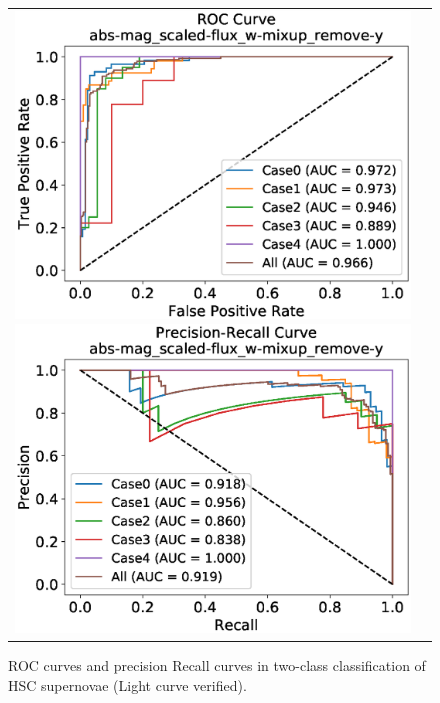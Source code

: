 \documentclass[useamsfonts]{pasj01}
\begin{document}
%
%
%
\begin{figure}[ht]
    \begin{tabular}{cc}
        \begin{minipage}{0.5\hsize}
            \begin{center}
                \includegraphics[width=\columnwidth]{figures/10_abs-mag_scaled-flux_w-mixup_remove-y_predictions_test_ROC_noedge_spec.eps}
            \end{center}
        \end{minipage}
        \begin{minipage}{0.5\hsize}
            \begin{center}
                \includegraphics[width=\columnwidth]{figures/10_abs-mag_scaled-flux_w-mixup_remove-y_predictions_test_PreRec_noedge_spec.eps}
            \end{center}
        \end{minipage}
    \end{tabular}
    \caption{%
  ROC curves and precision Recall curves in two-class classification of HSC supernovae (Light curve verified).
}%
    \label{fig:h2_test_gold}
\end{figure}
\end{document}
